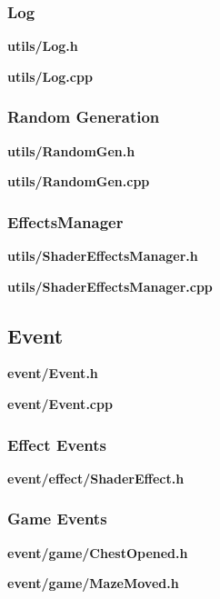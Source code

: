 \documentclass[../Main.tex]{subfiles}
\begin{document}
        \subsubsection{Log}
            \textbf{utils/Log.h}
            
            \textbf{utils/Log.cpp}
            

        \subsubsection{Random Generation}
            \textbf{utils/RandomGen.h}
            
            \textbf{utils/RandomGen.cpp}
            

        \subsubsection{EffectsManager}
            \textbf{utils/ShaderEffectsManager.h}
            
            \textbf{utils/ShaderEffectsManager.cpp}
            

    \subsection{Event}
        \textbf{event/Event.h}
        
        \textbf{event/Event.cpp}
        

        \subsubsection{Effect Events}
            \textbf{event/effect/ShaderEffect.h}
            

        \subsubsection{Game Events}
            \textbf{event/game/ChestOpened.h}
            

            \textbf{event/game/MazeMoved.h}
            
\end{document}
